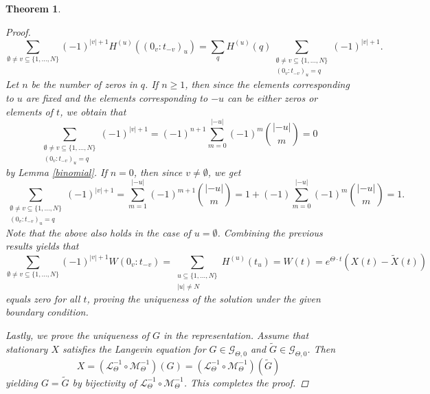 \documentclass[english, a4paper, 12pt,reqno]{amsart}
\newtheorem{theorem}[defi]{Theorem}
\begin{document}
\begin{theorem}
\begin{proof}
\begin{equation*}
 \sum_{\emptyset\neq v \subseteq \{1,\dots,N\}}(-1)^{|v|+1}H^{(u)}((0_v:t_{-v})_u) = \sum_q H^{(u)}(q) \sum_{\substack{\emptyset\neq v \subseteq \{1,\dots,N\}\\
(0_v:t_{-v})_u = q}}(-1)^{|v|+1}.
\end{equation*}
Let $n$ be the number of zeros in $q$. If $n \geq 1$, then since the elements corresponding to $u$ are fixed and the elements corresponding to $-u$ can be either zeros or elements of $t$, we obtain that
\begin{equation*}
\sum_{\substack{\emptyset\neq v \subseteq \{1,\dots,N\}\\
(0_v:t_{-v})_u = q}}(-1)^{|v|+1} = (-1)^{n+1} \sum_{m=0}^{|-u|} (-1)^m\binom{|-u|}{m}= 0
\end{equation*}
by Lemma \ref{binomial}. If $n=0$, then since $v\neq \emptyset$, we get
\begin{equation*}
\sum_{\substack{\emptyset\neq v \subseteq \{1,\dots,N\}\\
(0_v:t_{-v})_u = q}}(-1)^{|v|+1} = \sum_{m=1}^{|-u|} (-1)^{m+1}\binom{|-u|}{m}=1+ (-1) \sum_{m=0}^{|-u|} (-1)^{m}\binom{|-u|}{m}=1.
\end{equation*}
Note that the above also holds in the case of $u = \emptyset$. Combining the previous results yields that
\begin{equation*}
\sum_{\emptyset\neq v\subseteq \{1,\dots,N\}} (-1)^{|v|+1} W(0_v:t_{-v}) = \sum_{\substack{u\subseteq \{1,\dots,N\}\\
|u| \neq N}}H^{(u)}(t_u) = W(t) = e^{\Theta\cdot t}(X(t)- \tilde{X}(t))
\end{equation*}
equals zero for all $t$, proving the uniqueness of the solution under the given boundary condition.

Lastly, we prove the uniqueness of $G$ in the representation. Assume that stationary $X$ satisfies the Langevin equation for $G\in\mathcal{G}_{\Theta,0}$ and $\tilde{G}\in\mathcal{G}_{\Theta,0}$. Then
$$X = (\mathcal{L}_\Theta^{-1} \circ \mathcal{M}_\Theta^{-1} )(G) = (\mathcal{L}_\Theta^{-1} \circ \mathcal{M}_\Theta^{-1} )(\tilde{G})$$
yielding $G = \tilde{G}$ by bijectivity of $\mathcal{L}_\Theta^{-1} \circ \mathcal{M}_\Theta^{-1}$. This completes the proof.
\end{proof}
\end{theorem}











%

\end{document}
